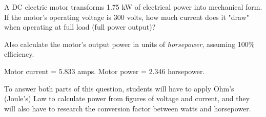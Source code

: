 

A DC electric motor transforms 1.75 kW of electrical power into mechanical form.  If the motor's operating voltage is 300 volts, how much current does it "draw" when operating at full load (full power output)?

Also calculate the motor's output power in units of {\it horsepower}, assuming 100\% efficiency.







Motor current = 5.833 amps.  Motor power = 2.346 horsepower.







To answer both parts of this question, students will have to apply Ohm's (Joule's) Law to calculate power from figures of voltage and current, and they will also have to research the conversion factor between watts and horsepower.




